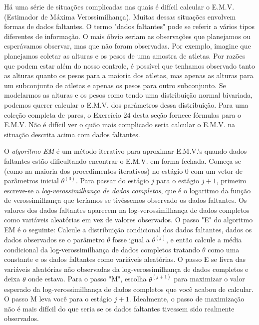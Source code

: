 Há uma série de situações complicadas nas quais é difícil calcular o E.M.V. (Estimador de Máxima Verossimilhança). Muitas dessas situações envolvem formas de dados faltantes. O termo "dados faltantes" pode se referir a vários tipos diferentes de informação. O mais óbvio seriam as observações que planejamos ou esperávamos observar, mas que não foram observadas. Por exemplo, imagine que planejamos coletar as alturas e os pesos de uma amostra de atletas. Por razões que podem estar além do nosso controle, é possível que tenhamos observado tanto as alturas quanto os pesos para a maioria dos atletas, mas apenas as alturas para um subconjunto de atletas e apenas os pesos para outro subconjunto. Se modelarmos as alturas e os pesos como tendo uma distribuição normal bivariada, podemos querer calcular o E.M.V. dos parâmetros dessa distribuição. Para uma coleção completa de pares, o Exercício 24 desta seção fornece fórmulas para o E.M.V. Não é difícil ver o quão mais complicado seria calcular o E.M.V. na situação descrita acima com dados faltantes.

O \textit{algoritmo EM} é um método iterativo para aproximar E.M.V.'s quando dados faltantes estão dificultando encontrar o E.M.V. em forma fechada. Começa-se (como na maioria dos procedimentos iterativos) no estágio 0 com um vetor de parâmetros inicial $\theta^{(0)}$. Para passar do estágio $j$ para o estágio $j+1$, primeiro escreve-se a \textit{log-verossimilhança de dados completos}, que é o logaritmo da função de verossimilhança que teríamos se tivéssemos observado os dados faltantes. Os valores dos dados faltantes aparecem na log-verossimilhança de dados completos como variáveis aleatórias em vez de valores observados. O passo "E" do algoritmo EM é o seguinte: Calcule a distribuição condicional dos dados faltantes, dados os dados observados se o parâmetro $\theta$ fosse igual a $\theta^{(j)}$, e então calcule a média condicional da log-verossimilhança de dados completos tratando $\theta$ como uma constante e os dados faltantes como variáveis aleatórias. O passo E se livra das variáveis aleatórias não observadas da log-verossimilhança de dados completos e deixa $\theta$ onde estava. Para o passo "M", escolha $\theta^{(j+1)}$ para maximizar o valor esperado da log-verossimilhança de dados completos que você acabou de calcular. O passo M leva você para o estágio $j+1$. Idealmente, o passo de maximização não é mais difícil do que seria se os dados faltantes tivessem sido realmente observados.

